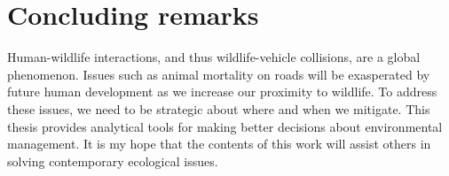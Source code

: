 \section{Concluding remarks}

Human-wildlife interactions, and thus wildlife-vehicle collisions, are a global phenomenon. Issues such as animal mortality on roads will be exasperated by future human development as we increase our proximity to wildlife. To address these issues, we need to be strategic about where and when we mitigate. This thesis provides analytical tools for making better decisions about environmental management. It is my hope that the contents of this work will assist others in solving contemporary ecological issues.